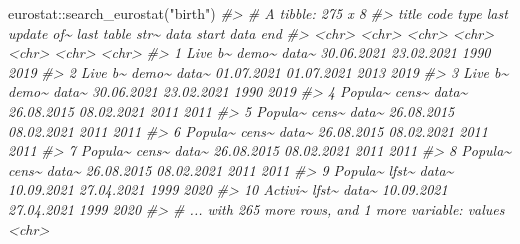 \documentclass[
]{article}
\newenvironment{Shaded}{\begin{snugshade}}{\end{snugshade}}
\newcommand{\CommentTok}[1]{\textcolor[rgb]{0.56,0.35,0.01}{\textit{#1}}}
\newcommand{\FunctionTok}[1]{\textcolor[rgb]{0.00,0.00,0.00}{#1}}
\newcommand{\NormalTok}[1]{#1}
\newcommand{\SpecialCharTok}[1]{\textcolor[rgb]{0.00,0.00,0.00}{#1}}
\newcommand{\StringTok}[1]{\textcolor[rgb]{0.31,0.60,0.02}{#1}}
\begin{document}
\begin{Shaded}
\begin{Highlighting}[]
\NormalTok{eurostat}\SpecialCharTok{::}\FunctionTok{search\_eurostat}\NormalTok{(}\StringTok{"birth"}\NormalTok{)}
\CommentTok{\#\textgreater{} \# A tibble: 275 x 8}
\CommentTok{\#\textgreater{}    title   code  type  \textasciigrave{}last update of\textasciitilde{} \textasciigrave{}last table str\textasciitilde{} \textasciigrave{}data start\textasciigrave{} \textasciigrave{}data end\textasciigrave{}}
\CommentTok{\#\textgreater{}    \textless{}chr\textgreater{}   \textless{}chr\textgreater{} \textless{}chr\textgreater{} \textless{}chr\textgreater{}            \textless{}chr\textgreater{}            \textless{}chr\textgreater{}        \textless{}chr\textgreater{}     }
\CommentTok{\#\textgreater{}  1 Live b\textasciitilde{} demo\textasciitilde{} data\textasciitilde{} 30.06.2021       23.02.2021       1990         2019      }
\CommentTok{\#\textgreater{}  2 Live b\textasciitilde{} demo\textasciitilde{} data\textasciitilde{} 01.07.2021       01.07.2021       2013         2019      }
\CommentTok{\#\textgreater{}  3 Live b\textasciitilde{} demo\textasciitilde{} data\textasciitilde{} 30.06.2021       23.02.2021       1990         2019      }
\CommentTok{\#\textgreater{}  4 Popula\textasciitilde{} cens\textasciitilde{} data\textasciitilde{} 26.08.2015       08.02.2021       2011         2011      }
\CommentTok{\#\textgreater{}  5 Popula\textasciitilde{} cens\textasciitilde{} data\textasciitilde{} 26.08.2015       08.02.2021       2011         2011      }
\CommentTok{\#\textgreater{}  6 Popula\textasciitilde{} cens\textasciitilde{} data\textasciitilde{} 26.08.2015       08.02.2021       2011         2011      }
\CommentTok{\#\textgreater{}  7 Popula\textasciitilde{} cens\textasciitilde{} data\textasciitilde{} 26.08.2015       08.02.2021       2011         2011      }
\CommentTok{\#\textgreater{}  8 Popula\textasciitilde{} cens\textasciitilde{} data\textasciitilde{} 26.08.2015       08.02.2021       2011         2011      }
\CommentTok{\#\textgreater{}  9 Popula\textasciitilde{} lfst\textasciitilde{} data\textasciitilde{} 10.09.2021       27.04.2021       1999         2020      }
\CommentTok{\#\textgreater{} 10 Activi\textasciitilde{} lfst\textasciitilde{} data\textasciitilde{} 10.09.2021       27.04.2021       1999         2020      }
\CommentTok{\#\textgreater{} \# ... with 265 more rows, and 1 more variable: values \textless{}chr\textgreater{}}
\end{Highlighting}
\end{Shaded}
\end{document}
